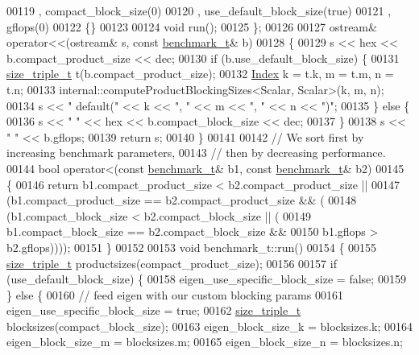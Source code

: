 \begin{DoxyCode}
00119     , compact\_block\_size(0)
00120     , use\_default\_block\_size(true)
00121     , gflops(0)
00122   \{\}
00123 
00124   \textcolor{keywordtype}{void} run();
00125 \};
00126 
00127 ostream& operator<<(ostream& s, \textcolor{keyword}{const} \hyperlink{structbenchmark__t}{benchmark\_t}& b)
00128 \{
00129   s << hex << b.compact\_product\_size << dec;
00130   \textcolor{keywordflow}{if} (b.use\_default\_block\_size) \{
00131     \hyperlink{structsize__triple__t}{size\_triple\_t} t(b.compact\_product\_size);
00132     \hyperlink{namespace_eigen_a62e77e0933482dafde8fe197d9a2cfde}{Index} k = t.k, m = t.m, n = t.n;
00133     internal::computeProductBlockingSizes<Scalar, Scalar>(k, m, n);
00134     s << \textcolor{stringliteral}{" default("} << k << \textcolor{stringliteral}{", "} << m << \textcolor{stringliteral}{", "} << n << \textcolor{stringliteral}{")"};
00135   \} \textcolor{keywordflow}{else} \{
00136     s << \textcolor{stringliteral}{" "} << hex << b.compact\_block\_size << dec;
00137   \}
00138   s << \textcolor{stringliteral}{" "} << b.gflops;
00139   \textcolor{keywordflow}{return} s;
00140 \}
00141 
00142 \textcolor{comment}{// We sort first by increasing benchmark parameters,}
00143 \textcolor{comment}{// then by decreasing performance.}
00144 \textcolor{keywordtype}{bool} operator<(\textcolor{keyword}{const} \hyperlink{structbenchmark__t}{benchmark\_t}& b1, \textcolor{keyword}{const} \hyperlink{structbenchmark__t}{benchmark\_t}& b2)
00145 \{ 
00146   \textcolor{keywordflow}{return} b1.compact\_product\_size < b2.compact\_product\_size ||
00147            (b1.compact\_product\_size == b2.compact\_product\_size && (
00148              (b1.compact\_block\_size < b2.compact\_block\_size || (
00149                b1.compact\_block\_size == b2.compact\_block\_size &&
00150                  b1.gflops > b2.gflops))));
00151 \}
00152 
00153 \textcolor{keywordtype}{void} benchmark\_t::run()
00154 \{
00155   \hyperlink{structsize__triple__t}{size\_triple\_t} productsizes(compact\_product\_size);
00156 
00157   \textcolor{keywordflow}{if} (use\_default\_block\_size) \{
00158     eigen\_use\_specific\_block\_size = \textcolor{keyword}{false};
00159   \} \textcolor{keywordflow}{else} \{
00160     \textcolor{comment}{// feed eigen with our custom blocking params}
00161     eigen\_use\_specific\_block\_size = \textcolor{keyword}{true};
00162     \hyperlink{structsize__triple__t}{size\_triple\_t} blocksizes(compact\_block\_size);
00163     eigen\_block\_size\_k = blocksizes.k;
00164     eigen\_block\_size\_m = blocksizes.m;
00165     eigen\_block\_size\_n = blocksizes.n;

\end{DoxyCode}
